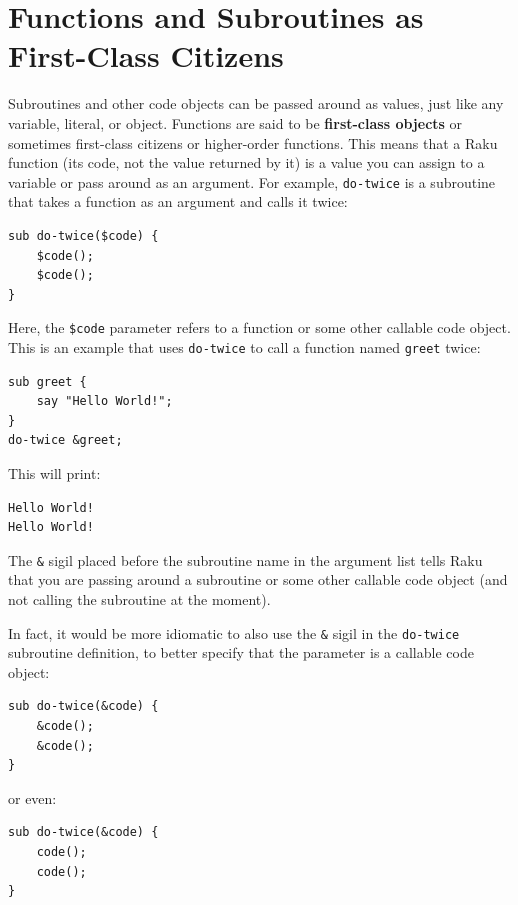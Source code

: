 \section{Functions and Subroutines as First-Class Citizens}
\label{first_class}

Subroutines and other code objects can be passed around as values, 
just like any variable, literal, or object. Functions are said 
to be {\bf first-class objects} or sometimes first-class 
citizens or higher-order functions. This means that a Raku 
function (its code, not the value returned by it) is a value 
you can assign to a variable or pass around as an argument. 
For example, \verb"do-twice" is a subroutine that takes a 
function as an argument and calls it twice:

\begin{verbatim}
sub do-twice($code) {
    $code(); 
    $code();
}
\end{verbatim}

Here, the \verb"$code" parameter refers to a function or some
other callable code object. This is an example that uses
\verb"do-twice" to call a function named \verb"greet" twice:

\begin{verbatim}
sub greet {
    say "Hello World!";
}
do-twice &greet;
\end{verbatim}

This will print:
\begin{verbatim}
Hello World!
Hello World!
\end{verbatim}

The \verb"&" sigil placed before the subroutine name in the 
argument list tells Raku that you are passing around a 
subroutine or some other callable code object (and not 
calling the subroutine at the moment).

In fact, it would be more idiomatic to also use the \verb"&" 
sigil in the \verb"do-twice" subroutine definition, to better 
specify that the parameter is a callable code object:

\begin{verbatim}
sub do-twice(&code) {
    &code(); 
    &code();
}
\end{verbatim}

or even:
\begin{verbatim}
sub do-twice(&code) {
    code(); 
    code();
}
\end{verbatim}

